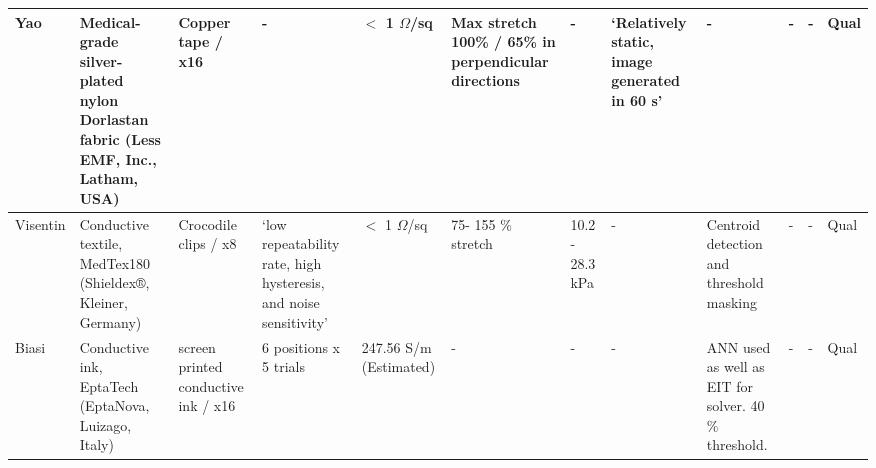 \begin{landscape}
\begin{table}[H]
\begin{tabular}{|L{1.7cm}|L{2.8cm}|L{2.0cm}|L{2.1cm}|L{2.2cm}|L{2.0cm}|L{1.7cm}|L{1.7cm}|L{2.4cm}|L{2.2cm}|L{1.6cm}|L{1.5cm}|}
				Yao \citep{Yao2012}& Medical-grade silver-plated nylon Dorlastan  fabric  (Less EMF, Inc., Latham, USA) & Copper tape / x16 & - & $<$ 1 $\Omega$/sq & Max stretch 100\% / 65\% in perpendicular directions & - & `Relatively static, image generated in 60 s' & - & - & - & Qual \\ \hline
				
				Visentin \citep{Visentin2016} & Conductive textile, MedTex180 (Shieldex®, Kleiner, Germany) & Crocodile clips / x8 & `low repeatability rate, high hysteresis, and noise sensitivity' & $<$ 1 $\Omega$/sq & 75- 155 \% stretch & 10.2 - 28.3 kPa & - & Centroid detection and threshold masking & - & - & Qual \\ \hline
				
				Biasi \citep{Biasi2022} & Conductive ink, EptaTech (EptaNova, Luizago, Italy) & screen printed conductive ink / x16 & 6 positions x 5 trials & 247.56 S/m (Estimated) & - & - & - & ANN used as well as EIT for solver. 40 \% threshold. & - & - & Qual \\ \hline
				
				
			\end{tabular}
		\end{table}
\end{landscape}
